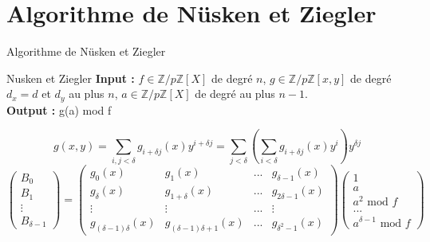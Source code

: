 \documentclass[10pt,a4paper]{beamer}
\begin{document}
\begin{frame}
\begin{columns}
\begin{figure}
            \end{figure}
    \end{columns}
\end{frame}


\section{Algorithme de Nüsken et Ziegler}
\begin{frame}{Algorithme de Nüsken et Ziegler}
    \begin{block}{Nusken et Ziegler}
        \textbf{Input :} $f \in \mathbb{Z}/p\mathbb{Z}[X]$ de degré $n$, $g \in \mathbb{Z}/p\mathbb{Z}[x,y]$ de degré $d_x=d$ et $d_y$ au plus $n$, $a \in \mathbb{Z}/p\mathbb{Z}[X]$ de degré au plus $n-1$. \\
        \textbf{Output :} g(a) mod f
    \end{block}

    \[
    g(x,y) = \sum_{i,j<\delta}g_{i+\delta j}(x)y^{i+\delta j} = \sum_{j<\delta} \left( \sum_{i<\delta} g_{i+\delta j}(x)y^i \right) y^{\delta j}     
    \]
    \[
    \begin{pmatrix}
        B_0 \\
        B_1 \\
        \vdots \\
        B_{\delta-1}
    \end{pmatrix}
    =
    \begin{pmatrix}
        g_0(x)&g_1(x)&...&g_{\delta -1}(x) \\
        g_{\delta}(x)&g_{1+\delta}(x)&...&g_{2\delta-1}(x) \\
        \vdots&\vdots&...&\vdots \\
        g_{(\delta-1)\delta}(x)&g_{(\delta-1)\delta+1}(x)&...&g_{\delta^2-1}(x)
    \end{pmatrix}
    \begin{pmatrix}
        1 \\
        a \\
        a^2 \text{ mod }f \\
        ... \\
        a^{\delta-1} \text{ mod }f
    \end{pmatrix}
    \]
    

    
\end{frame}
\end{document}
